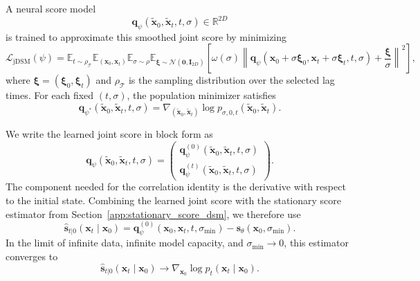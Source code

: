 \documentclass[11pt,twoside,fleqn]{article}
\begin{document}
A neural score model
\[
    \bm{q}_{\psi}(\widetilde{\bm{x}}_0,\widetilde{\bm{x}}_t,t,\sigma)
    \in \mathbb{R}^{2D}
\]
is trained to approximate this smoothed joint score by minimizing
\begin{equation}
    \mathcal{L}_{\mathrm{jDSM}}(\psi)
    =
    \mathbb{E}_{t\sim\rho_{\mathcal{T}}}
    \mathbb{E}_{(\bm{x}_0,\bm{x}_t)}
    \mathbb{E}_{\sigma\sim\rho}
    \mathbb{E}_{\bm{\xi}\sim\mathcal{N}(\bm{0},\bm{I}_{2D})}
    \left[
        \omega(\sigma)
        \left\|
            \bm{q}_{\psi}
            \left(
                \bm{x}_0+\sigma\bm{\xi}_0,
                \bm{x}_t+\sigma\bm{\xi}_t,
                t,
                \sigma
            \right)
            +
            \frac{\bm{\xi}}{\sigma}
        \right\|^2
    \right],
    \label{eq:app_joint_dsm_loss}
\end{equation}
where $\bm{\xi}=(\bm{\xi}_0,\bm{\xi}_t)$ and
$\rho_{\mathcal{T}}$ is the sampling distribution over the selected lag times.
For each fixed $(t,\sigma)$, the population minimizer satisfies
\begin{equation}
    \bm{q}_{\psi^\ast}
    (\widetilde{\bm{x}}_0,\widetilde{\bm{x}}_t,t,\sigma)
    =
    \nabla_{(\widetilde{\bm{x}}_0,\widetilde{\bm{x}}_t)}
    \log p_{\sigma,0,t}
    (\widetilde{\bm{x}}_0,\widetilde{\bm{x}}_t).
    \label{eq:app_joint_dsm_optimality}
\end{equation}

We write the learned joint score in block form as
\begin{equation}
    \bm{q}_{\psi}
    (\widetilde{\bm{x}}_0,\widetilde{\bm{x}}_t,t,\sigma)
    =
    \begin{pmatrix}
        \bm{q}_{\psi}^{(0)}
        (\widetilde{\bm{x}}_0,\widetilde{\bm{x}}_t,t,\sigma)
        \\
        \bm{q}_{\psi}^{(t)}
        (\widetilde{\bm{x}}_0,\widetilde{\bm{x}}_t,t,\sigma)
    \end{pmatrix}.
    \label{eq:app_learned_joint_score_blocks}
\end{equation}
The component needed for the correlation identity is the derivative with
respect to the initial state. Combining the learned joint score with the
stationary score estimator from Section~\ref{app:stationary_score_dsm}, we
therefore use
\begin{equation}
    \widehat{\bm{s}}_{t|0}(\bm{x}_t\mid\bm{x}_0)
    =
    \bm{q}_{\psi}^{(0)}
    (\bm{x}_0,\bm{x}_t,t,\sigma_{\min})
    -
    \bm{s}_{\theta}(\bm{x}_0,\sigma_{\min}).
    \label{eq:app_conditional_score_estimator}
\end{equation}
In the limit of infinite data, infinite model capacity, and
$\sigma_{\min}\to0$, this estimator converges to
\begin{equation}
    \widehat{\bm{s}}_{t|0}(\bm{x}_t\mid\bm{x}_0)
    \longrightarrow
    \nabla_{\bm{x}_0}
    \log p_t(\bm{x}_t\mid\bm{x}_0).
    \label{eq:app_conditional_score_convergence}
\end{equation}
\end{document}
